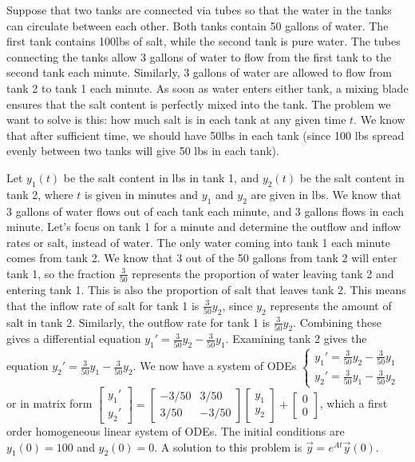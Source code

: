 Suppose that two tanks are connected via tubes so that the water in the tanks can circulate between each other.  Both tanks contain 50 gallons of water. The first tank contains 100lbs of salt, while the second tank is pure water.  The tubes connecting the tanks allow 3 gallons of water to flow from the first tank to the second tank each minute.  Similarly, 3 gallons of water are allowed to flow from tank 2 to tank 1 each minute. As soon as water enters either tank, a mixing blade ensures that the salt content is perfectly mixed into the tank.  The problem we want to solve is this: how much salt is in each tank at any given time $t$.  We know that after sufficient time, we should have 50lbs in each tank (since 100 lbs spread evenly between two tanks will give 50 lbs in each tank).

Let $y_1(t)$ be the salt content in lbs in tank 1, and $y_2(t)$ be the salt content in tank 2, where $t$ is given in minutes and $y_1$ and $y_2$ are given in lbs. 
We know that 3 gallons of water flows out of each tank each minute, and 3 gallons flows in each minute.  
Let's focus on tank 1 for a minute and determine the outflow and inflow rates or salt, instead of water.  The only water coming into tank 1 each minute comes from tank 2.  
We know that 3 out of the 50 gallons from tank 2 will enter tank 1, so the fraction $\frac{3}{50}$ represents the proportion of water leaving tank 2 and entering tank 1. This is also the proportion of salt that leaves tank 2.
This means that the inflow rate of salt for tank 1 is $\frac{3}{50}y_2$, since $y_2$ represents the amount of salt in tank 2. 
Similarly, the outflow rate for tank 1 is $\frac{3}{50}y_2$.  
Combining these gives a differential equation $y_1' = \frac{3}{50}y_2 - \frac{3}{50}y_1$.  Examining tank 2 gives the equation $y_2' = \frac{3}{50}y_1 - \frac{3}{50}y_2$.  
We now have a system of ODEs 
$\begin{cases}
y_1' = \frac{3}{50}y_2 - \frac{3}{50}y_1\\
y_2' = \frac{3}{50}y_1 - \frac{3}{50}y_2
\end{cases}$ or in matrix form 
$
\begin{bmatrix}
y_1'\\
y_2'
\end{bmatrix}
=
\begin{bmatrix}
-3/50&3/50\\
3/50&-3/50
\end{bmatrix}
\begin{bmatrix}
y_1\\
y_2
\end{bmatrix}
+
\begin{bmatrix}
0\\
0
\end{bmatrix}$, which a first order homogeneous linear system of ODEs. The initial conditions are $y_1(0)=100$ and $y_2(0)=0$. A solution to this problem is $\vec y = e^{A t}\vec y(0)$.


